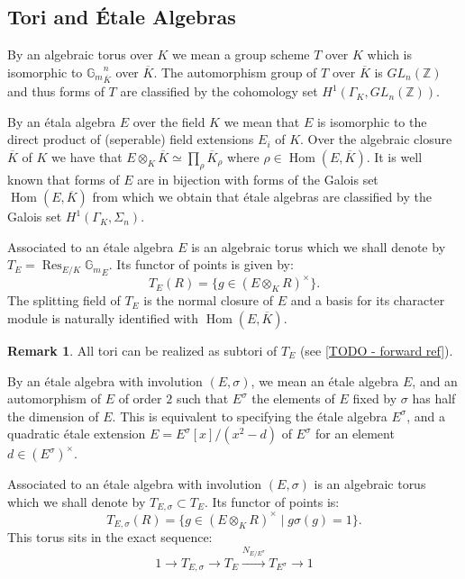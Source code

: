 \documentclass{article}
\theoremstyle{plain}
\theoremstyle{definition}
\newtheorem{remark}[theorem]{Remark}
\DeclareMathOperator{\Hom}{Hom}
\DeclareMathOperator{\Res}{Res}
\newcommand{\ZZ}{\mathbb{Z}}
\newcommand{\Gm}{\mathbb{G}_m}
\newcommand{\GalKbK}{\Gamma_K}
\begin{document}
\subsection{Tori and \'Etale Algebras}

By an algebraic torus over $K$ we mean a group scheme $T$ over $K$ which is isomorphic to ${\Gm}_{\overline{K}}^n$ over $\overline{K}$.
The automorphism group of $T$ over $\overline{K}$ is $GL_n(\ZZ)$ and thus forms of $T$ are classified by the cohomology set $H^1(\GalKbK,GL_n(\ZZ))$.

By an \'etala algebra $E$ over the field $K$ we mean that $E$ is isomorphic to the direct product of (seperable) field extensions $E_i$ of $K$.
Over the algebraic closure $\overline{K}$ of $K$ we have that $E\otimes_K \overline{K} \simeq \prod_\rho \overline{K}_\rho$ where $\rho \in \Hom(E,\overline{K})$.
It is well known that forms of $E$ are in bijection with forms of the Galois set $\Hom(E,\overline{K})$ from which we obtain that \'etale algebras are classified by the Galois set $H^1(\GalKbK, \Sigma_n)$.

Associated to an \'etale algebra $E$ is an algebraic torus which we shall denote by $T_E = \Res_{E/K} {\Gm}_E$.
Its functor of points is given by:
\[ T_E(R) = \{ g \in (E\otimes_K R)^\times \}. \]
The splitting field of $T_E$ is the normal closure of $E$ and a basis for its character module is naturally identified with $\Hom(E,\overline{K})$.

\begin{remark}
All tori can be realized as subtori of $T_E$ (see \ref{TODO - forward ref}).
\end{remark}

By an \'etale algebra with involution $(E,\sigma)$, we mean an \'etale algebra $E$, and an automorphism of $E$ of order $2$ such that $E^\sigma$ the elements of $E$ fixed by $\sigma$ has half the dimension of $E$.
This is equivalent to specifying the \'etale algebra $E^\sigma$, and a quadratic \'etale extension $E = E^\sigma[x]/(x^2-d)$ of $E^\sigma$ for an element $d\in (E^\sigma)^\times$.

Associated to an \'etale algebra with involution $(E,\sigma)$ is an algebraic torus which we shall denote by $T_{E,\sigma} \subset T_E$.
Its functor of points is:
\[ T_{E,\sigma}(R) = \{ g \in (E\otimes_K R)^\times \mid g\sigma(g) = 1 \}. \]
This torus sits in the exact sequence:
\[ 1 \rightarrow  T_{E,\sigma} \rightarrow T_E \overset{N_{E/E^\sigma}}\rightarrow T_{E^\sigma} \rightarrow 1 \]
\end{document}
